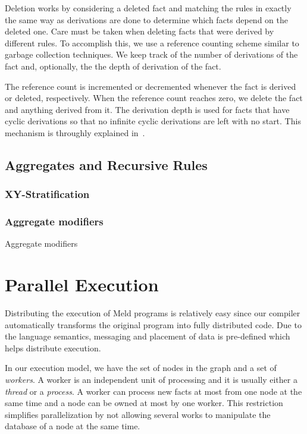 \documentclass[preprint]{sigplanconf}
\begin{document}
Deletion works by considering a deleted fact and matching the rules in exactly the same way as
derivations are done to determine which facts depend on the deleted one. Care must be taken when
deleting facts that were derived by different rules. To accomplish this, we use a reference counting
scheme similar to garbage collection techniques. We
keep track of the number of derivations of the fact and, optionally, the
the depth of derivation of the fact.

The reference count is incremented or decremented whenever the fact is derived or
deleted, respectively. When the reference count reaches zero, we delete the fact and anything
derived from it. The derivation depth is used for facts that have cyclic derivations so that
no infinite cyclic derivations are left with no start.
This mechanism is throughly explained in~\cite{ashley-rollman-iclp09}.

\subsection{Aggregates and Recursive Rules}

\subsubsection{XY-Stratification}

\cite{zaniolo-arni-ong-dood93}

\subsubsection{Aggregate modifiers}

Aggregate modifiers 

\section{Parallel Execution}

Distributing the execution of Meld programs is relatively easy since our compiler automatically
transforms the original program into fully distributed code. Due to the language semantics,
messaging and placement of data is pre-defined which helps distribute execution.

In our execution model, we have the set of nodes in the graph and a set of \emph{workers}.
A worker is an independent unit of processing and it is usually either a \emph{thread} or
a \emph{process}. A worker can process new facts at most from one node at the same time and
a node can be owned at most by one worker. This restriction simplifies parallelization by not
allowing several works to manipulate the database of a node at the same time.
\end{document}
